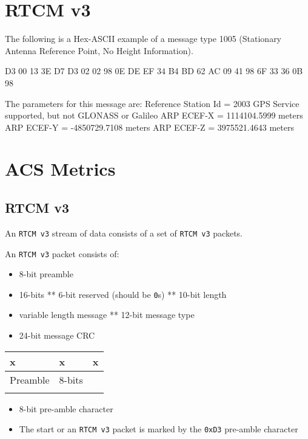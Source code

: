 \section{RTCM v3}\label{rtcm-v3}

The following is a Hex-ASCII example of a message type 1005 (Stationary
Antenna Reference Point, No Height Information).

D3 00 13 3E D7 D3 02 02 98 0E DE EF 34 B4 BD 62 AC 09 41 98 6F 33 36 0B
98

The parameters for this message are: 
Reference Station Id = 2003 
GPS
Service supported, but not GLONASS or Galileo 
ARP ECEF-X =
1114104.5999 meters 
ARP ECEF-Y = -4850729.7108 meters 
ARP ECEF-Z =
3975521.4643 meters

\section{ACS Metrics}\label{acs-metrics}

\subsection{RTCM v3}\label{rtcm-v3-1}

An \texttt{RTCM\ v3} stream of data consists of a set of
\texttt{RTCM\ v3} packets.

An \texttt{RTCM\ v3} packet consists of:

\begin{itemize}
\item
  8-bit preamble
\item
  16-bits ** 6-bit reserved (should be \texttt{0}s) ** 10-bit length
\item
  variable length message ** 12-bit message type
\item
  24-bit message CRC
\end{itemize}

\begin{longtable}[]{@{}lll@{}}
\toprule
x & x & x\tabularnewline
\midrule
\endhead
Preamble & 8-bits &\tabularnewline
\tabularnewline
\bottomrule
\end{longtable}

\begin{itemize}
\item
  8-bit pre-amble character
\item
  The start or an \texttt{RTCM\ v3} packet is marked by the
  \texttt{0xD3} pre-amble character
\end{itemize}

